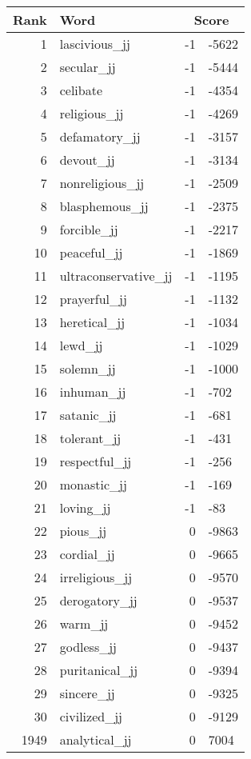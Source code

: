\begin{longtable}[!htbp]{| rlr@{.}l |}
    \hline
    \textbf{Rank} & \textbf{Word} & \multicolumn{2}{c|}{\textbf{Score}} \\
    \hline
    \endhead
    1 & lascivious\_jj & -1 & -5622 \\
    2 & secular\_jj & -1 & -5444 \\
    3 & celibate & -1 & -4354 \\
    4 & religious\_jj & -1 & -4269 \\
    5 & defamatory\_jj & -1 & -3157 \\
    6 & devout\_jj & -1 & -3134 \\
    7 & nonreligious\_jj & -1 & -2509 \\
    8 & blasphemous\_jj & -1 & -2375 \\
    9 & forcible\_jj & -1 & -2217 \\
    10 & peaceful\_jj & -1 & -1869 \\
    11 & ultraconservative\_jj & -1 & -1195 \\
    12 & prayerful\_jj & -1 & -1132 \\
    13 & heretical\_jj & -1 & -1034 \\
    14 & lewd\_jj & -1 & -1029 \\
    15 & solemn\_jj & -1 & -1000 \\
    16 & inhuman\_jj & -1 & -702 \\
    17 & satanic\_jj & -1 & -681 \\
    18 & tolerant\_jj & -1 & -431 \\
    19 & respectful\_jj & -1 & -256 \\
    20 & monastic\_jj & -1 & -169 \\
    21 & loving\_jj & -1 & -83 \\
    22 & pious\_jj & 0 & -9863 \\
    23 & cordial\_jj & 0 & -9665 \\
    24 & irreligious\_jj & 0 & -9570 \\
    25 & derogatory\_jj & 0 & -9537 \\
    26 & warm\_jj & 0 & -9452 \\
    27 & godless\_jj & 0 & -9437 \\
    28 & puritanical\_jj & 0 & -9394 \\
    29 & sincere\_jj & 0 & -9325 \\
    30 & civilized\_jj & 0 & -9129 \\
    1949 & analytical\_jj & 0 & 7004 \\

\end{longtable}
